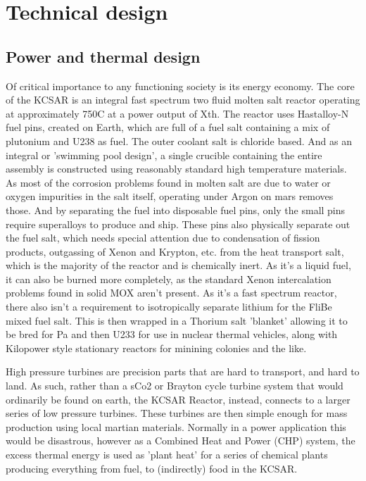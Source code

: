 \documentclass[10pt]{article}
\begin{document}
\section*{Technical design}
\subsection{Power and thermal design}
Of critical importance to any functioning society is its energy economy. The core of the KCSAR is an integral fast spectrum two fluid molten salt reactor operating at approximately 750C at a power output of Xth. The reactor uses Hastalloy-N fuel pins, created on Earth, which are full of a fuel salt containing a mix of plutonium and U238 as fuel. The outer coolant salt is chloride based. And as an integral or 'swimming pool design', a single crucible containing the entire assembly is constructed using reasonably standard high temperature materials. As most of the corrosion problems found in molten salt are due to water or oxygen impurities in the salt itself, operating under Argon on mars removes those. And by separating the fuel into disposable fuel pins, only the small pins require superalloys to produce and ship. These pins also physically separate out the fuel salt, which needs special attention due to condensation of fission products, outgassing of Xenon and Krypton, etc. from the heat transport salt, which is the majority of the reactor and is chemically inert. As it's a liquid fuel, it can also be burned more completely, as the standard Xenon intercalation problems found in solid MOX aren't present. As it's a fast spectrum reactor, there also isn't a requirement to isotropically separate lithium for the FliBe mixed fuel salt. This is then wrapped in a Thorium salt 'blanket' allowing it to be bred for Pa and then U233 for use in nuclear thermal vehicles, along with Kilopower style stationary reactors for minining colonies and the like.

High pressure turbines are precision parts that are hard to transport, and hard to land. As such, rather than a sCo2 or Brayton cycle turbine system that would ordinarily be found on earth, the KCSAR Reactor, instead, connects to a larger series of low pressure turbines. These turbines are then simple enough for mass production using local martian materials. Normally in a power application this would be disastrous, however as a Combined Heat and Power (CHP) system, the excess thermal energy is used as 'plant heat' for a series of chemical plants producing everything from fuel, to (indirectly) food in the KCSAR.
\end{document}
